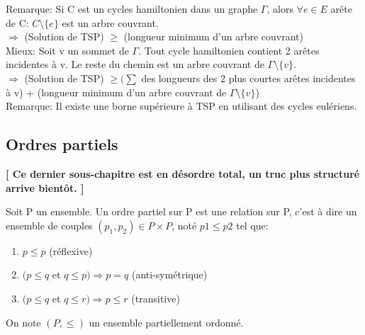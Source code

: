\begin{exmp}

\end{exmp}


Remarque: Si C est un cycles hamiltonien dans un graphe $\Gamma$, alors $\forall e \in E$ arête de C: $ C \setminus\{e\}$ est un arbre couvrant.\\

$\Rightarrow$ (Solution de TSP) $\geq$ (longueur minimum d'un arbre couvrant)\\

Mieux: Soit v un sommet de $\Gamma$. Tout cycle hamiltonien contient 2 arêtes incidentes à v. Le reste du chemin est un arbre couvrant de $\Gamma \setminus\{v\}$.\\

$\Rightarrow$ (Solution de TSP) $\geq (\sum$ des longueurs des 2 plus courtes arêtes incidentes à v) + (longueur minimum d'un arbre couvrant de $\Gamma \setminus\{v\}$)\\

Remarque: Il existe une borne supérieure à TSP en utilisant des cycles eulériens. \\


\subsection{Ordres partiels}

\textbf{ [ Ce dernier sous-chapitre est en désordre total, un truc plus structuré arrive bientôt. ] } 

\begin{defn}
Soit P un ensemble. Un ordre partiel sur P est une relation sur P, c'est à dire un ensemble de couples $(p_{1},p_{2}) \in P\times P$, noté $p{1} \leq p{2}$ tel que:
	\begin{enumerate}
		\item $p \leq p$ (réflexive)
		\item $(p \leq q$ et $q \leq p ) \Rightarrow p = q$ (anti-symétrique)
		\item $(p \leq q$ et $q \leq r ) \Rightarrow p \leq r$ (transitive)\\
	\end{enumerate}
On note $(P,\leq)$ un ensemble partiellement ordonné.\\
\end{defn}

